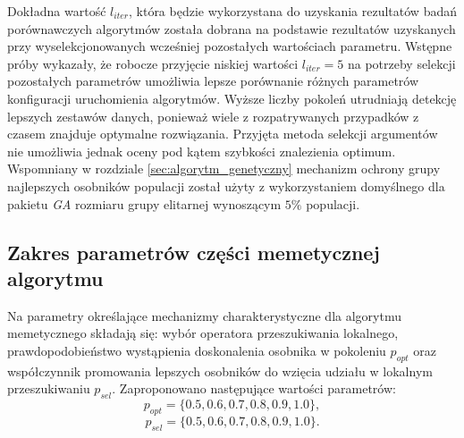 \par
Dokładna wartość $l_{iter}$, która będzie wykorzystana do uzyskania rezultatów badań porównawczych algorytmów została dobrana na podstawie rezultatów uzyskanych przy wyselekcjonowanych wcześniej pozostałych wartościach parametru. Wstępne próby wykazały, że robocze przyjęcie niskiej wartości $l_{iter}=5$ na potrzeby selekcji pozostałych parametrów umożliwia lepsze porównanie różnych parametrów konfiguracji uruchomienia algorytmów. Wyższe liczby pokoleń utrudniają detekcję lepszych zestawów danych, ponieważ wiele z rozpatrywanych przypadków z czasem znajduje optymalne rozwiązania. Przyjęta metoda selekcji argumentów nie umożliwia jednak oceny pod kątem szybkości znalezienia optimum. Wspomniany w rozdziale \ref{sec:algorytm_genetyczny} mechanizm ochrony grupy najlepszych osobników populacji został użyty z wykorzystaniem domyślnego dla pakietu \emph{GA} rozmiaru grupy elitarnej wynoszącym $5\%$ populacji.





\subsection{Zakres parametrów części memetycznej algorytmu}
Na parametry określające mechanizmy charakterystyczne dla algorytmu memetycznego składają się: wybór operatora przeszukiwania lokalnego, prawdopodobieństwo wystąpienia doskonalenia osobnika w pokoleniu $p_{opt}$ oraz współczynnik promowania lepszych osobników do wzięcia udziału w lokalnym przeszukiwaniu $p_{sel}$. Zaproponowano następujące wartości parametrów: 
\[p_{opt} = \lbrace0.5, 0.6, 0.7, 0.8, 0.9, 1.0\rbrace,\]
\[p_{sel} = \lbrace0.5, 0.6, 0.7, 0.8, 0.9, 1.0\rbrace.\]


